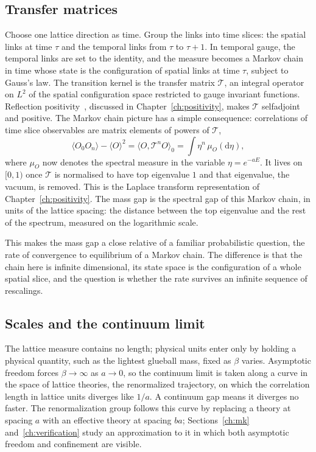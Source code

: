 \subsection{Transfer matrices}

Choose one lattice direction as time. Group the links into time slices: the spatial links at time $\tau$ and the temporal links from $\tau$ to $\tau+1$. In temporal gauge, the temporal links are set to the identity, and the measure becomes a Markov chain in time whose state is the configuration of spatial links at time $\tau$, subject to Gauss's law. The transition kernel is the transfer matrix $\mathcal T$, an integral operator on $L^2$ of the spatial configuration space restricted to gauge invariant functions. Reflection positivity~\cite{OSe,Lu77}, discussed in Chapter~\ref{ch:positivity}, makes $\mathcal T$ selfadjoint and positive. The Markov chain picture has a simple consequence: correlations of time slice observables are matrix elements of powers of $\mathcal T$,
\[
\langle O_0O_n\rangle-\langle O\rangle^2=\langle O,\mathcal T^nO\rangle_0=\int\eta^n\,\mu_O(\mathrm d\eta),
\]
where $\mu_O$ now denotes the spectral measure in the variable $\eta=e^{-aE}$. It lives on $[0,1)$ once $\mathcal T$ is normalised to have top eigenvalue $1$ and that eigenvalue, the vacuum, is removed. This is the Laplace transform representation of Chapter~\ref{ch:positivity}. The mass gap is the spectral gap of this Markov chain, in units of the lattice spacing: the distance between the top eigenvalue and the rest of the spectrum, measured on the logarithmic scale.

This makes the mass gap a close relative of a familiar probabilistic question, the rate of convergence to equilibrium of a Markov chain. The difference is that the chain here is infinite dimensional, its state space is the configuration of a whole spatial slice, and the question is whether the rate survives an infinite sequence of rescalings.

\subsection{Scales and the continuum limit}

The lattice measure contains no length; physical units enter only by holding a physical quantity, such as the lightest glueball mass, fixed as $\beta$ varies. Asymptotic freedom forces $\beta\to\infty$ as $a\to0$, so the continuum limit is taken along a curve in the space of lattice theories, the renormalized trajectory, on which the correlation length in lattice units diverges like $1/a$. A continuum gap means it diverges no faster. The renormalization group follows this curve by replacing a theory at spacing $a$ with an effective theory at spacing $ba$; Sections~\ref{ch:mk} and~\ref{ch:verification} study an approximation to it in which both asymptotic freedom and confinement are visible.

